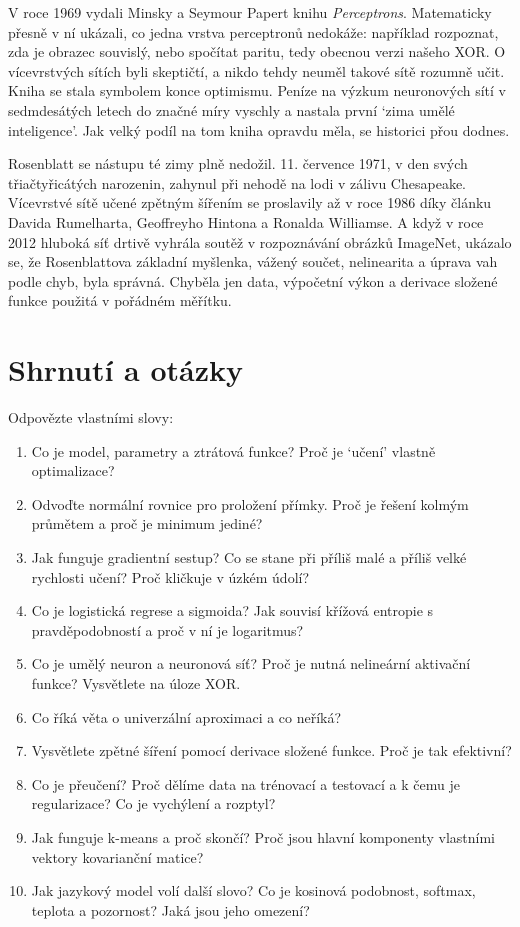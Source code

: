 V roce 1969 vydali Minsky a Seymour Papert knihu \textit{Perceptrons}. Matematicky přesně v ní ukázali, co jedna vrstva perceptronů nedokáže: například rozpoznat, zda je obrazec souvislý, nebo spočítat paritu, tedy obecnou verzi našeho XOR. O vícevrstvých sítích byli skeptičtí, a nikdo tehdy neuměl takové sítě rozumně učit. Kniha se stala symbolem konce optimismu. Peníze na výzkum neuronových sítí v sedmdesátých letech do značné míry vyschly a nastala první `zima umělé inteligence'. Jak velký podíl na tom kniha opravdu měla, se historici přou dodnes.

Rosenblatt se nástupu té zimy plně nedožil. 11. července 1971, v den svých třiačtyřicátých narozenin, zahynul při nehodě na lodi v zálivu Chesapeake. Vícevrstvé sítě učené zpětným šířením se proslavily až v roce 1986 díky článku Davida Rumelharta, Geoffreyho Hintona a Ronalda Williamse. A když v roce 2012 hluboká síť drtivě vyhrála soutěž v rozpoznávání obrázků ImageNet, ukázalo se, že Rosenblattova základní myšlenka, vážený součet, nelinearita a úprava vah podle chyb, byla správná. Chyběla jen data, výpočetní výkon a derivace složené funkce použitá v pořádném měřítku.

\section{Shrnutí a otázky}

\begin{problem}
  Odpovězte vlastními slovy:
  \begin{enumerate}
    \item Co je model, parametry a ztrátová funkce? Proč je `učení' vlastně optimalizace?
    \item Odvoďte normální rovnice pro proložení přímky. Proč je řešení kolmým průmětem a proč je minimum jediné?
    \item Jak funguje gradientní sestup? Co se stane při příliš malé a příliš velké rychlosti učení? Proč kličkuje v úzkém údolí?
    \item Co je logistická regrese a sigmoida? Jak souvisí křížová entropie s pravděpodobností a proč v ní je logaritmus?
    \item Co je umělý neuron a neuronová síť? Proč je nutná nelineární aktivační funkce? Vysvětlete na úloze XOR.
    \item Co říká věta o univerzální aproximaci a co neříká?
    \item Vysvětlete zpětné šíření pomocí derivace složené funkce. Proč je tak efektivní?
    \item Co je přeučení? Proč dělíme data na trénovací a testovací a k čemu je regularizace? Co je vychýlení a rozptyl?
    \item Jak funguje k-means a proč skončí? Proč jsou hlavní komponenty vlastními vektory kovarianční matice?
    \item Jak jazykový model volí další slovo? Co je kosinová podobnost, softmax, teplota a pozornost? Jaká jsou jeho omezení?
  \end{enumerate}
\end{problem}
